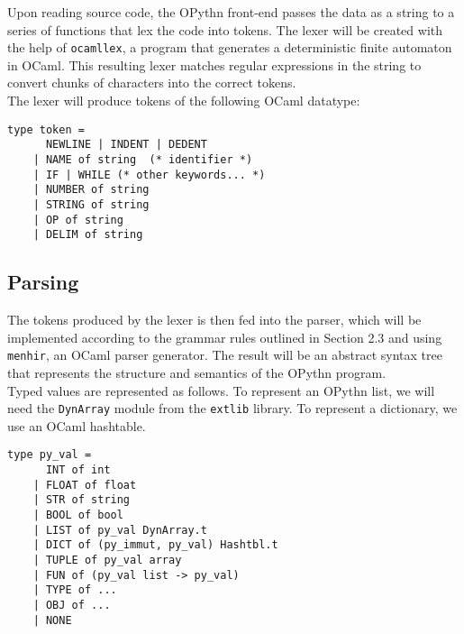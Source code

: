 \documentclass[11pt, twoside]{article}
\newcommand{\ms}{\texttt}
\begin{document}
    \begin{algorithm}
    \begin{algorithmic}
        \EndWhile
        \State {}
    \EndProcedure
    \end{algorithmic}
    \end{algorithm}
    Upon reading source code, the OPythn front-end passes the data as a string to a series of functions that lex the code into tokens. The lexer will be created with the help of \texttt{ocamllex}, a program that generates a deterministic finite automaton in OCaml. This resulting lexer matches regular expressions in the string to convert chunks of characters into the correct tokens.\\
    \indent The lexer will produce tokens of the following OCaml datatype:
    \begin{lstlisting}[language=caml]
    type token =
      NEWLINE | INDENT | DEDENT
    | NAME of string  (* identifier *)
    | IF | WHILE (* other keywords... *)
    | NUMBER of string
    | STRING of string
    | OP of string
    | DELIM of string
    \end{lstlisting}
    \subsection{Parsing}
    The tokens produced by the lexer is then fed into the parser, which will be implemented according to the grammar rules outlined in Section 2.3 and using \texttt{menhir}, an OCaml parser generator. The result will be an abstract syntax tree that represents the structure and semantics of the OPythn program.\\
     \indent Typed values are represented as follows. To represent an OPythn list, we will need the \ms{DynArray} module from the \ms{extlib} library. To represent a dictionary, we use an OCaml hashtable.
    \begin{lstlisting}[language=caml]
    type py_val =
      INT of int
    | FLOAT of float
    | STR of string
    | BOOL of bool
    | LIST of py_val DynArray.t
    | DICT of (py_immut, py_val) Hashtbl.t
    | TUPLE of py_val array
    | FUN of (py_val list -> py_val)
    | TYPE of ...
    | OBJ of ...
    | NONE
    \end{lstlisting}
\end{document}

